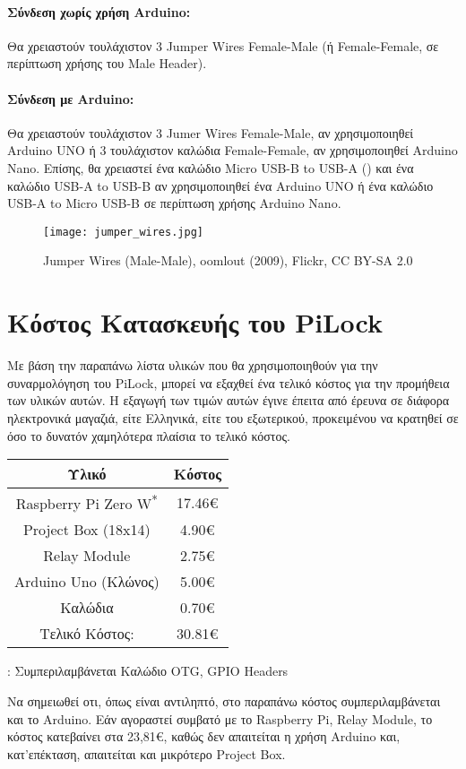 		 	\paragraph{Σύνδεση χωρίς χρήση Arduino:}
		 		Θα χρειαστούν τουλάχιστον 3 Jumper Wires Female-Male (ή Female-Female, σε περίπτωση χρήσης του Male Header).
		 	\paragraph{Σύνδεση με Arduino:}
		 		\label{par:ard_conn}
		 		Θα χρειαστούν τουλάχιστον 3 Jumer Wires Female-Male, αν χρησιμοποιηθεί Arduino UNO ή 3 τουλάχιστον καλώδια Female-Female, αν χρησιμοποιηθεί Arduino Nano. Επίσης, θα χρειαστεί ένα καλώδιο Micro USB-B to USB-A () και ένα καλώδιο USB-A to USB-B αν χρησιμοποιηθεί ένα Arduino UNO ή ένα καλώδιο USB-A to Micro USB-B σε περίπτωση χρήσης Arduino Nano.

		 	\begin{figure}[h]
			\centering
				\texttt{[image: jumper\_wires.jpg]}
				\caption{Jumper Wires (Male-Male), oomlout (2009), Flickr, CC BY-SA 2.0}
			\end{figure}

\section{Κόστος Κατασκευής του PiLock}
	Με βάση την παραπάνω λίστα υλικών που θα χρησιμοποιηθούν για την συναρμολόγηση του PiLock, μπορεί να εξαχθεί ένα τελικό κόστος για την προμήθεια των υλικών αυτών. Η εξαγωγή των τιμών αυτών έγινε έπειτα από έρευνα σε διάφορα ηλεκτρονικά μαγαζιά, είτε Ελληνικά, είτε του εξωτερικού, προκειμένου να κρατηθεί σε όσο το δυνατόν χαμηλότερα πλαίσια το τελικό κόστος.

	\begin{center}
	\begin{tabular}{||c c||}
		\hline
		Υλικό & Κόστος \\ [0.5ex] 
		\hline\hline
		Raspberry Pi Zero W\textsuperscript{*} & 17.46\euro \\
		Project Box (18x14) & 4.90\euro \\
		Relay Module & 2.75\euro \\
		Arduino Uno (Κλώνος) & 5.00\euro \\
		Καλώδια & 0.70\euro \\
		\hline\hline
		Τελικό Κόστος: & 30.81\euro \\
		\hline
	\end{tabular}
	\end{center}

	{\footnotesize *: Συμπεριλαμβάνεται Καλώδιο OTG, GPIO Headers}

	Να σημειωθεί οτι, όπως είναι αντιληπτό, στο παραπάνω κόστος συμπεριλαμβάνεται και το Arduino. Εάν αγοραστεί συμβατό με το Raspberry Pi, Relay Module, το κόστος κατεβαίνει στα 23,81\euro, καθώς δεν απαιτείται η χρήση Arduino και, κατ'επέκταση, απαιτείται και μικρότερο Project Box.

	